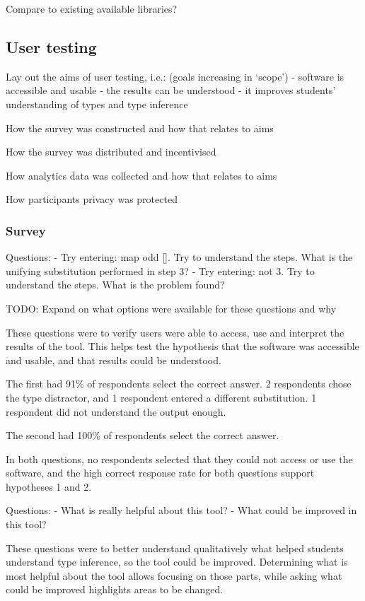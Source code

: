 \documentclass[a4paper,fleqn,12pt]{article}
\begin{document}
Compare to existing available libraries?

\subsection{User testing}\label{id:h.bsy9mpun8nk3}
Lay out the aims of user testing, i.e.: (goals increasing in ‘scope’)
- software is accessible and usable
- the results can be understood
- it improves students’ understanding of types and type inference

How the survey was constructed and how that relates to aims

How the survey was distributed and incentivised

How analytics data was collected and how that relates to aims

How participants privacy was protected
\subsubsection{Survey}\label{id:h.yqiowsgjmohq}
Questions:
- Try entering: map odd []. Try to understand the steps. What is the unifying substitution performed in step 3?
- Try entering: not 3. Try to understand the steps. What is the problem found?

TODO: Expand on what options were available for these questions and why

These questions were to verify users were able to access, use and interpret the results of the tool. This helps test the hypothesis that the software was accessible and usable, and that results could be understood.

The first had 91\% of respondents select the correct answer. 2 respondents chose the type distractor, and 1 respondent entered a different substitution. 1 respondent did not understand the output enough.

The second had 100\% of respondents select the correct answer.

In both questions, no respondents selected that they could not access or use the software, and the high correct response rate for both questions support hypotheses 1 and 2.

Questions:
- What is really helpful about this tool?
- What could be improved in this tool?

These questions were to better understand qualitatively what helped students understand type inference, so the tool could be improved. Determining what is most helpful about the tool allows focusing on those parts, while asking what could be improved highlights areas to be changed.
\end{document}
